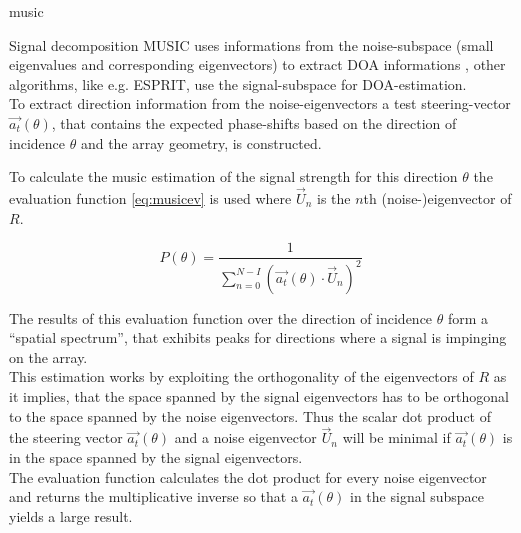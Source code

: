 \begin{subchapter}{\acrshort{music}}
\begin{subsubchapter}{Signal decomposition}
    MUSIC uses informations from the noise-subspace (small eigenvalues
    and corresponding eigenvectors) to extract
    DOA informations \cite{madisetti2010}, other algorithms,
    like e.g. ESPRIT, use the signal-subspace for DOA-estimation. \\

    To extract direction information from the noise-eigenvectors
    a test steering-vector $\vec{a_{t}}(\theta)$, that contains
    the expected phase-shifts based on the direction of incidence
    $\theta$ and the array geometry, is constructed.

    To calculate the \gls{music} estimation of the signal strength for
    this direction $\theta$ the evaluation function \ref{eq:musicev}
    is used \cite[p. 12]{girdmusic} where $\vec{U}_{n}$ is the $n$th
    (noise-)eigenvector of $R$.

    \begin{equation}
      \label{eq:musicev}
      P(\theta)= \frac{1}{
        \sum_{n=0}^{N-I} \left( \vec{a_{t}}(\theta) \cdot \vec{U}_{n} \right)^2
      }
    \end{equation}

    The results of this evaluation function over the direction
    of incidence $\theta$ form a ``spatial spectrum'', that exhibits
    peaks for directions where a signal is impinging on the array. \\

    This estimation works by exploiting the orthogonality of the
    eigenvectors of $R$ as it implies, that the space spanned by
    the signal eigenvectors has to be orthogonal to the space spanned
    by the noise eigenvectors.
    Thus the scalar dot product of the steering vector $\vec{a_{t}}(\theta)$
    and a noise eigenvector $\vec{U}_{n}$ will be minimal if
    $\vec{a_{t}}(\theta)$ is in the space spanned by the signal
    eigenvectors. \\

    The evaluation function calculates the dot product for every
    noise eigenvector and returns the multiplicative inverse so that a
    $\vec{a_{t}}(\theta)$ in the signal subspace yields a large
    result.
  \end{subsubchapter}
\end{subchapter}
